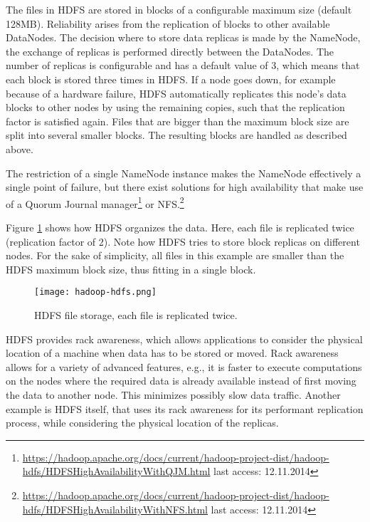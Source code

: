 The files in HDFS are stored in blocks of a configurable maximum size (default 128MB). Reliability arises from the replication of blocks to other available DataNodes. The decision where to store data replicas is made by the NameNode, the exchange of replicas is performed directly between the DataNodes. The number of replicas is configurable and has a default value of 3, which means that each block is stored three times in HDFS. If a node goes down, for example because of a hardware failure, HDFS automatically replicates this node's data blocks to other nodes by using the remaining copies, such that the replication factor is satisfied again. Files that are bigger than the maximum block size are split into several smaller blocks. The resulting blocks are handled as described above.

The restriction of a single NameNode instance makes the NameNode effectively a single point of failure, but there exist solutions for high availability that make use of a Quorum Journal manager\footnote{\url{https://hadoop.apache.org/docs/current/hadoop-project-dist/hadoop-hdfs/HDFSHighAvailabilityWithQJM.html} last access: 12.11.2014} or NFS.\footnote{\url{https://hadoop.apache.org/docs/current/hadoop-project-dist/hadoop-hdfs/HDFSHighAvailabilityWithNFS.html} last access: 12.11.2014}

Figure \ref{fig:hadoop-hdfs} shows how HDFS organizes the data. Here, each file is replicated twice (replication factor of 2). Note how HDFS tries to store block replicas on different nodes. For the sake of simplicity, all files in this example are smaller than the HDFS maximum block size, thus fitting in a single block.

\begin{figure}
  \centering
  \texttt{[image: hadoop-hdfs.png]}
  \caption[HDFS file storage]{HDFS file storage, each file is replicated twice.}
  \label{fig:hadoop-hdfs}
\end{figure}

HDFS provides rack awareness, which allows applications to consider the physical location of a machine when data has to be stored or moved. Rack awareness allows for a variety of advanced features, e.g., it is faster to execute computations on the nodes where the required data is already available instead of first moving the data to another node. This minimizes possibly slow data traffic. Another example is HDFS itself, that uses its rack awareness for its performant replication process, while considering the physical location of the replicas.

